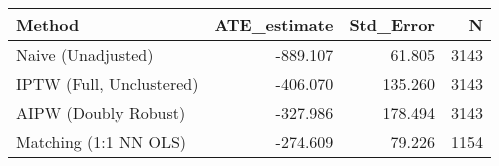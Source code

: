 \begin{tabular}{lrrr}
\toprule
Method & ATE_estimate & Std_Error & N \\
\midrule
Naive (Unadjusted) & -889.107 & 61.805 & 3143 \\
IPTW (Full, Unclustered) & -406.070 & 135.260 & 3143 \\
AIPW (Doubly Robust) & -327.986 & 178.494 & 3143 \\
Matching (1:1 NN OLS) & -274.609 & 79.226 & 1154 \\
\bottomrule
\end{tabular}
